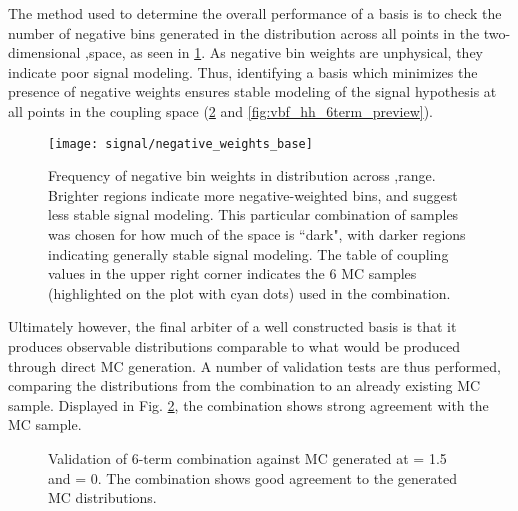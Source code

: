     The method used to determine the overall performance of a basis is to check the number of negative bins generated
        in the \mhh distribution across all points in the two-dimensional \kvv,\kl space, as seen in \ref{fig:vbf_hh_6term_nWeight_grid}.
    As negative bin weights are unphysical, they indicate poor signal modeling.
    Thus, identifying a basis which minimizes the presence of negative weights ensures stable modeling of the signal hypothesis at all points in the coupling space (\ref{fig:vbf_hh_6term_validation} and \ref{fig:vbf_hh_6term_preview}).

    \begin{figure}[tbh]
        \texttt{[image: signal/negative\_weights\_base]}
        \caption{
            Frequency of negative bin weights in \mhh distribution across \kvv,\kl range.
            Brighter regions indicate more negative-weighted bins, and suggest less stable signal modeling.
            This particular combination of samples was chosen for how much of the space is ``dark",
                with darker regions indicating generally stable signal modeling.
            The table of coupling values in the upper right corner indicates the 6 MC samples
                (highlighted on the plot with cyan dots) used in the combination.
        }
        \label{fig:vbf_hh_6term_nWeight_grid}
    \end{figure}

    Ultimately however, the final arbiter of a well constructed basis is that it produces observable distributions comparable to what would be produced through direct MC generation.
    A number of validation tests are thus performed, comparing the distributions from the combination to an already existing MC sample.
    Displayed in Fig. \ref{fig:vbf_hh_6term_validation}, the combination shows strong agreement with the MC sample.

    \begin{figure}[tbh]
        \caption{
            Validation of 6-term combination against MC generated at \kv = 1.5 and \kl = 0.
            The combination shows good agreement to the generated MC distributions.
        }
        \label{fig:vbf_hh_6term_validation}
    \end{figure}

